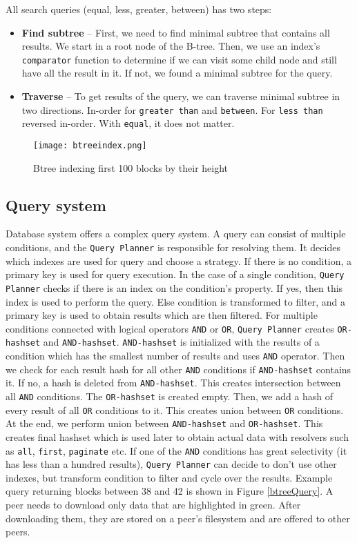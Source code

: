 All search queries (equal, less, greater, between) has two steps:
\begin{itemize}
    \item \textbf{Find subtree} -- First, we need to find minimal subtree that contains all results. We start in a root node of the B-tree. Then, we use an index's \texttt{comparator} function to determine if we can visit some child node and still have all the result in it. If not, we found a minimal subtree for the query.
    \item \textbf{Traverse} -- To get results of the query, we can traverse minimal subtree in two directions. In-order for \texttt{greater than} and \texttt{between}. For \texttt{less than} reversed in-order. With \texttt{equal}, it does not matter.
\end{itemize}

\begin{figure}[h]
    \centering
    \texttt{[image: btreeindex.png]}
    \caption{Btree indexing first 100 blocks by their height}
    \label{btree}
\end{figure}

\subsection{Query system}
Database system offers a complex query system. A query can consist of multiple conditions, and the \texttt{Query Planner} is responsible for resolving them. It decides which indexes are used for query and choose a strategy. If there is no condition, a primary key is used for query execution. In the case of a single condition, \texttt{Query Planner} checks if there is an index on the condition's property. If yes, then this index is used to perform the query. Else condition is transformed to filter, and a primary key is used to obtain results which are then filtered. For multiple conditions connected with logical operators \texttt{AND} or \texttt{OR}, \texttt{Query Planner} creates \texttt{OR-hashset} and \texttt{AND-hashset}. \texttt{AND-hashset} is initialized with the results of a condition which has the smallest number of results and uses \texttt{AND} operator. Then we check for each result hash for all other \texttt{AND} conditions if \texttt{AND-hashset} contains it. If no, a hash is deleted from \texttt{AND-hashset}. This creates intersection between all \texttt{AND} conditions. The \texttt{OR-hashset} is created empty. Then, we add a hash of every result of all \texttt{OR} conditions to it. This creates union between \texttt{OR} conditions. At the end, we perform union between \texttt{AND-hashset} and \texttt{OR-hashset}. This creates final hashset which is used later to obtain actual data with resolvers such as \texttt{all}, \texttt{first}, \texttt{paginate} etc. If one of the \texttt{AND} conditions has great selectivity (it has less than a hundred results), \texttt{Query Planner} can decide to don't use other indexes, but transform condition to filter and cycle over the results. Example query returning blocks between 38 and 42 is shown in Figure \ref{btreeQuery}. A peer needs to download only data that are highlighted in green. After downloading them, they are stored on a peer's filesystem and are offered to other peers. 

